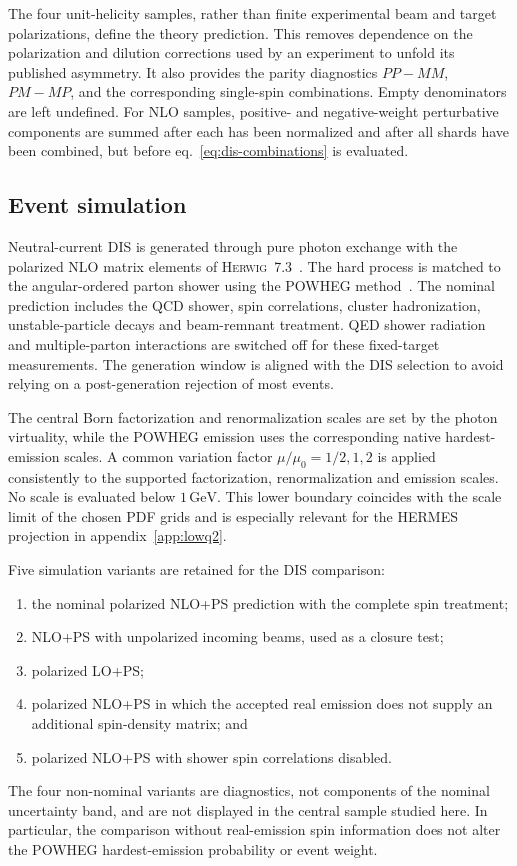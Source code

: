 \documentclass[11pt,a4paper]{article}
\newcommand{\Herwig}{\textsc{Herwig}}
\newcommand{\GeV}{\ensuremath{\,\mathrm{GeV}}}
\begin{document}
The four unit-helicity samples, rather than finite experimental beam and
target polarizations, define the theory prediction.  This removes dependence
on the polarization and dilution corrections used by an experiment to unfold
its published asymmetry.  It also provides the parity diagnostics
$PP-MM$, $PM-MP$, and the corresponding single-spin combinations.  Empty
denominators are left undefined.  For NLO samples, positive- and
negative-weight perturbative components are summed after each has been
normalized and after all shards have been combined, but before
eq.~\eqref{eq:dis-combinations} is evaluated.

\subsection{Event simulation}

Neutral-current DIS is generated through pure photon exchange with the
polarized NLO matrix elements of \Herwig~7.3~\cite{Bewick:2023tfi}.  The hard
process is matched to the angular-ordered parton shower using the POWHEG
method~\cite{Nason:2004rx,Frixione:2007vw}.  The nominal prediction includes
the QCD shower, spin correlations, cluster hadronization, unstable-particle
decays and beam-remnant treatment.  QED shower radiation and multiple-parton
interactions are switched off for these fixed-target measurements.  The
generation window is aligned with the DIS selection to avoid relying on a
post-generation rejection of most events.

The central Born factorization and renormalization scales are set by the
photon virtuality, while the POWHEG emission uses the corresponding native
hardest-emission scales.  A common variation factor
$\mu/\mu_0=1/2,1,2$ is applied consistently to the supported
factorization, renormalization and emission scales.  No scale is evaluated
below $1\GeV$.  This lower boundary coincides with the scale limit of the
chosen PDF grids and is especially relevant for the HERMES projection in
appendix~\ref{app:lowq2}.

Five simulation variants are retained for the DIS comparison:
\begin{enumerate}
  \item the nominal polarized NLO+PS prediction with the complete spin
  treatment;
  \item NLO+PS with unpolarized incoming beams, used as a closure test;
  \item polarized LO+PS;
  \item polarized NLO+PS in which the accepted real emission does not supply
  an additional spin-density matrix; and
  \item polarized NLO+PS with shower spin correlations disabled.
\end{enumerate}
The four non-nominal variants are diagnostics, not components of the nominal
uncertainty band, and are not displayed in the central sample studied here.
In particular, the comparison without real-emission spin information does
not alter the POWHEG hardest-emission probability or event weight.
\end{document}
